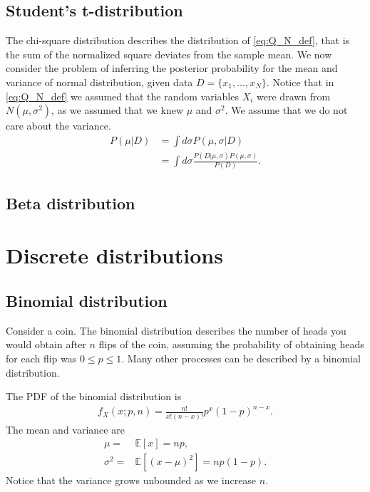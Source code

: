 \subsection{Student's t-distribution}

The chi-square distribution describes the distribution of \eqref{eq:Q_N_def}, that is the sum of the normalized square deviates from the sample mean.
We now consider the problem of inferring the posterior probability for the mean and variance of normal distribution, given data $D=\{x_1,...,x_N\}$. 
Notice that in \eqref{eq:Q_N_def} we assumed that the random variables $X_i$ were drawn from $N\left(\mu,\sigma^2\right)$, as we assumed that we knew $\mu$ and $\sigma^2$. 
We assume that we do not care about the variance. 
\begin{align}
    P\left(\mu|D\right)
    &=
    \int d\sigma P\left(\mu,\sigma|D\right)
    \nonumber\\
    &=
    \int d\sigma \frac{P\left(D|\mu,\sigma\right) P\left(\mu,\sigma\right)}{P\left(D\right)}
    .
\end{align}

\subsection{Beta distribution}


\section{Discrete distributions}
\subsection{Binomial distribution}
Consider a coin. 
The binomial distribution describes the number of heads you would obtain after $n$ flips of the coin, assuming the probability of obtaining heads for each flip was $0\leq p\leq 1$.
Many other processes can be described by a binomial distribution.

The PDF of the binomial distribution is
\begin{align}
\label{eq:binomial_pdf}
    f_X\left(x;p,n\right)
    =
    \frac{n!}{x!\left(n-x\right)!} p^x\left(1-p\right)^{n-x}
    .
\end{align}
The mean and variance are
\begin{align}
    \mu
    =&
    \mathbb{E}\left[x\right]
    =
    np 
    ,\\
    \sigma^2
    =&
    \mathbb{E}\left[\left(x-\mu\right)^2\right]
    =
    np\left(1-p\right) 
    .
\end{align}
Notice that the variance grows unbounded as we increase $n$.

